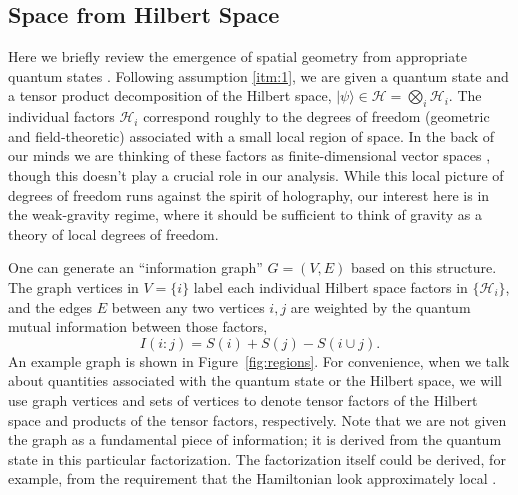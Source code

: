 \documentclass[%
preprint,
nofootinbib,
amsmath,amssymb,
aps,
prd,
showpacs,
superscriptaddress
]{revtex4-1}
\DeclareMathOperator{\co}{:}
\begin{document}
\subsection{Space from Hilbert Space}\label{sec:briefreview}

Here we briefly review the emergence of spatial geometry from appropriate quantum states \cite{Cao:2016mst}.
Following assumption \ref{itm:1}, we are given a quantum state and a tensor product decomposition of the Hilbert space, $|\psi\rangle\in\mathcal{H}=\bigotimes_i\mathcal{H}_i$. 
The individual factors $\mathcal{H}_i$ correspond roughly to the degrees of freedom (geometric and field-theoretic) associated with a small local region of space.
In the back of our minds we are thinking of these factors as finite-dimensional vector spaces \cite{Bao:2017rnv}, though this doesn't play a crucial role in our analysis.
While this local picture of degrees of freedom runs against the spirit of holography, our interest here is in the weak-gravity regime, where it should be sufficient to think of gravity as a theory of local degrees of freedom.

One can generate an ``information graph'' $G=(V,E)$ based on this structure. The graph vertices in $V=\{i\}$ label each individual Hilbert space factors in $\{\mathcal{H}_i\}$, and the edges $E$ between any two vertices $i,j$ are weighted by the quantum mutual information between those factors,
\begin{equation}
  I(i\co j)=S(i)+S(j)-S(i\cup j).
\end{equation}
An example graph is shown in  Figure~\ref{fig:regions}.
For convenience, when we talk about quantities associated with the quantum state or the Hilbert space, we will use graph vertices and sets of vertices to denote tensor factors of the Hilbert space and products of the tensor factors, respectively. 
Note that we are not given the graph as a fundamental piece of information; it is derived from the quantum state in this particular factorization.
The factorization itself could be derived, for example, from the requirement that the Hamiltonian look approximately local \cite{Cotler:2017abq}.
\end{document}
